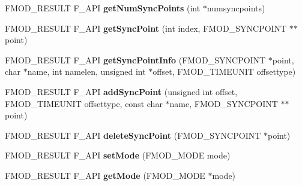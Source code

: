 \begin{DoxyCompactItemize}
\item 
F\+M\+O\+D\+\_\+\+R\+E\+S\+U\+LT F\+\_\+\+A\+PI {\bfseries get\+Num\+Sync\+Points} (int $\ast$numsyncpoints)\hypertarget{class_f_m_o_d_1_1_sound_a3a8c9fd2fb487a3b3a66952f09840fbf}{}\label{class_f_m_o_d_1_1_sound_a3a8c9fd2fb487a3b3a66952f09840fbf}

\item 
F\+M\+O\+D\+\_\+\+R\+E\+S\+U\+LT F\+\_\+\+A\+PI {\bfseries get\+Sync\+Point} (int index, F\+M\+O\+D\+\_\+\+S\+Y\+N\+C\+P\+O\+I\+NT $\ast$$\ast$point)\hypertarget{class_f_m_o_d_1_1_sound_ab091d9a05e5f30f7a3ffbe1503335d32}{}\label{class_f_m_o_d_1_1_sound_ab091d9a05e5f30f7a3ffbe1503335d32}

\item 
F\+M\+O\+D\+\_\+\+R\+E\+S\+U\+LT F\+\_\+\+A\+PI {\bfseries get\+Sync\+Point\+Info} (F\+M\+O\+D\+\_\+\+S\+Y\+N\+C\+P\+O\+I\+NT $\ast$point, char $\ast$name, int namelen, unsigned int $\ast$offset, F\+M\+O\+D\+\_\+\+T\+I\+M\+E\+U\+N\+IT offsettype)\hypertarget{class_f_m_o_d_1_1_sound_a99aa787828a6fa111ba2663a3c35b6e0}{}\label{class_f_m_o_d_1_1_sound_a99aa787828a6fa111ba2663a3c35b6e0}

\item 
F\+M\+O\+D\+\_\+\+R\+E\+S\+U\+LT F\+\_\+\+A\+PI {\bfseries add\+Sync\+Point} (unsigned int offset, F\+M\+O\+D\+\_\+\+T\+I\+M\+E\+U\+N\+IT offsettype, const char $\ast$name, F\+M\+O\+D\+\_\+\+S\+Y\+N\+C\+P\+O\+I\+NT $\ast$$\ast$point)\hypertarget{class_f_m_o_d_1_1_sound_abb46f258c1ac4563f20b17a4647b0dc0}{}\label{class_f_m_o_d_1_1_sound_abb46f258c1ac4563f20b17a4647b0dc0}

\item 
F\+M\+O\+D\+\_\+\+R\+E\+S\+U\+LT F\+\_\+\+A\+PI {\bfseries delete\+Sync\+Point} (F\+M\+O\+D\+\_\+\+S\+Y\+N\+C\+P\+O\+I\+NT $\ast$point)\hypertarget{class_f_m_o_d_1_1_sound_a21e86318ac39e576111e642b57db4187}{}\label{class_f_m_o_d_1_1_sound_a21e86318ac39e576111e642b57db4187}

\item 
F\+M\+O\+D\+\_\+\+R\+E\+S\+U\+LT F\+\_\+\+A\+PI {\bfseries set\+Mode} (F\+M\+O\+D\+\_\+\+M\+O\+DE mode)\hypertarget{class_f_m_o_d_1_1_sound_a8410551349a26de45abe6a931ea6965a}{}\label{class_f_m_o_d_1_1_sound_a8410551349a26de45abe6a931ea6965a}

\item 
F\+M\+O\+D\+\_\+\+R\+E\+S\+U\+LT F\+\_\+\+A\+PI {\bfseries get\+Mode} (F\+M\+O\+D\+\_\+\+M\+O\+DE $\ast$mode)\hypertarget{class_f_m_o_d_1_1_sound_ae8bfe6364a2283c43c21f03d43daafe5}{}\label{class_f_m_o_d_1_1_sound_ae8bfe6364a2283c43c21f03d43daafe5}


\end{DoxyCompactItemize}
